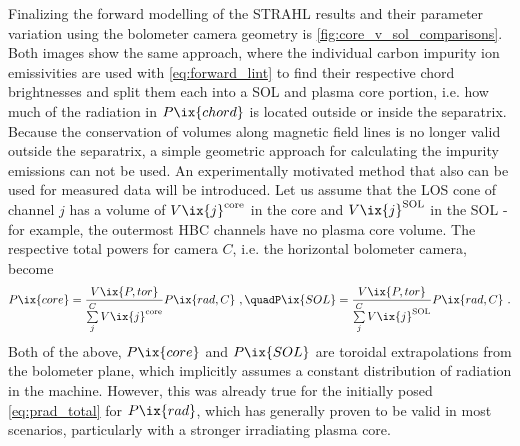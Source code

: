 %
            Finalizing the forward modelling of the STRAHL results and their parameter variation using the bolometer camera geometry is \cref{fig:core_v_sol_comparisons}. Both images show the same approach, where the individual carbon impurity ion emissivities are used with \cref{eq:forward_lint} to find their respective chord brightnesses and split them each into a SOL and plasma core portion, i.e. how much of the radiation in $P\ix{chord}$ is located outside or inside the separatrix. Because the conservation of volumes along magnetic field lines is no longer valid outside the separatrix, a simple geometric approach for calculating the impurity emissions can not be used. An experimentally motivated method that also can be used for measured data will be introduced. Let us assume that the LOS cone of channel $j$ has a volume of $V\ix{j}^{\text{core}}$ in the core and $V\ix{j}^{\text{SOL}}$ in the SOL - for example, the outermost HBC channels have no plasma core volume. The respective total powers for camera $C$, i.e. the horizontal bolometer camera, become%
%
            \begin{align}%
                P\ix{core}=\frac{V\ix{P,tor}}{\sum\limits_{j}^{C}V\ix{j}^{\text{core}}}P\ix{rad,C}%
                \,\,,\quad%
                P\ix{SOL}=\frac{V\ix{P,tor}}{\sum\limits_{j}^{C}V\ix{j}^{\text{SOL}}}P\ix{rad,C}\,\,.%
                \label{eq:prad_corevsol}%
            \end{align}%
%
            Both of the above, $P\ix{core}$ and $P\ix{SOL}$ are toroidal extrapolations from the bolometer plane, which implicitly assumes a constant distribution of radiation in the machine. However, this was already true for the initially posed \cref{eq:prad_total} for $P\ix{rad}$, which has generally proven to be valid in most scenarios\cite{Klinger2019,Zhang2018}, particularly with a stronger irradiating plasma core.\\%
